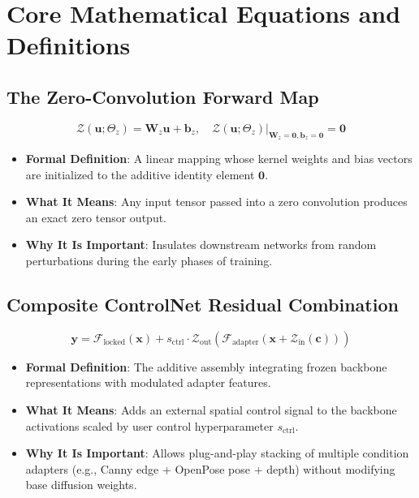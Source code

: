 \documentclass[11pt,a4paper]{article}
\theoremstyle{definition}
\begin{document}
\section{Core Mathematical Equations and Definitions}

\subsection{The Zero-Convolution Forward Map}
{\boldmath
\begin{equation}
\mathcal{Z}(\mathbf{u}; \Theta_z) = \mathbf{W}_z \mathbf{u} + \mathbf{b}_z, \quad \left. \mathcal{Z}(\mathbf{u}; \Theta_z) \right|_{\mathbf{W}_z = \mathbf{0}, \mathbf{b}_z = \mathbf{0}} = \mathbf{0}
\end{equation}
}
\begin{itemize}
    \item \textbf{Formal Definition}: A linear mapping whose kernel weights and bias vectors are initialized to the additive identity element $\mathbf{0}$.
    \item \textbf{What It Means}: Any input tensor passed into a zero convolution produces an exact zero tensor output.
    \item \textbf{Why It Is Important}: Insulates downstream networks from random perturbations during the early phases of training.
\end{itemize}

\subsection{Composite ControlNet Residual Combination}
{\boldmath
\begin{equation}
\mathbf{y} = \mathcal{F}_{\text{locked}}(\mathbf{x}) + s_{\text{ctrl}} \cdot \mathcal{Z}_{\text{out}}\left( \mathcal{F}_{\text{adapter}}\left( \mathbf{x} + \mathcal{Z}_{\text{in}}(\mathbf{c}) \right) \right)
\end{equation}
}
\begin{itemize}
    \item \textbf{Formal Definition}: The additive assembly integrating frozen backbone representations with modulated adapter features.
    \item \textbf{What It Means}: Adds an external spatial control signal to the backbone activations scaled by user control hyperparameter $s_{\text{ctrl}}$.
    \item \textbf{Why It Is Important}: Allows plug-and-play stacking of multiple condition adapters (e.g., Canny edge + OpenPose pose + depth) without modifying base diffusion weights.
\end{itemize}
\end{document}
